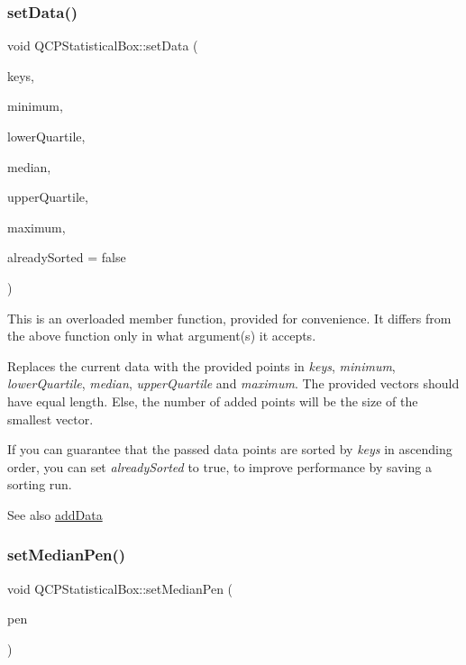 \subsubsection{\texorpdfstring{set\+Data()}{setData()}\hspace{0.1cm}{\footnotesize\ttfamily [2/2]}}
{\footnotesize\ttfamily void Q\+C\+P\+Statistical\+Box\+::set\+Data (\begin{DoxyParamCaption}\item[{const Q\+Vector$<$ double $>$ \&}]{keys,  }\item[{const Q\+Vector$<$ double $>$ \&}]{minimum,  }\item[{const Q\+Vector$<$ double $>$ \&}]{lower\+Quartile,  }\item[{const Q\+Vector$<$ double $>$ \&}]{median,  }\item[{const Q\+Vector$<$ double $>$ \&}]{upper\+Quartile,  }\item[{const Q\+Vector$<$ double $>$ \&}]{maximum,  }\item[{bool}]{already\+Sorted = {\ttfamily false} }\end{DoxyParamCaption})}

This is an overloaded member function, provided for convenience. It differs from the above function only in what argument(s) it accepts.

Replaces the current data with the provided points in {\itshape keys}, {\itshape minimum}, {\itshape lower\+Quartile}, {\itshape median}, {\itshape upper\+Quartile} and {\itshape maximum}. The provided vectors should have equal length. Else, the number of added points will be the size of the smallest vector.

If you can guarantee that the passed data points are sorted by {\itshape keys} in ascending order, you can set {\itshape already\+Sorted} to true, to improve performance by saving a sorting run.

\begin{DoxySeeAlso}{See also}
\hyperlink{class_q_c_p_statistical_box_a9a8739c5b8291db8fd839e892fc8f478}{add\+Data} 
\end{DoxySeeAlso}
\mbox{\label{class_q_c_p_statistical_box_a7260ac55b669f5d0a74f16d5ca84c52c}} 
\subsubsection{\texorpdfstring{set\+Median\+Pen()}{setMedianPen()}}
{\footnotesize\ttfamily void Q\+C\+P\+Statistical\+Box\+::set\+Median\+Pen (\begin{DoxyParamCaption}\item[{const Q\+Pen \&}]{pen }\end{DoxyParamCaption})}

